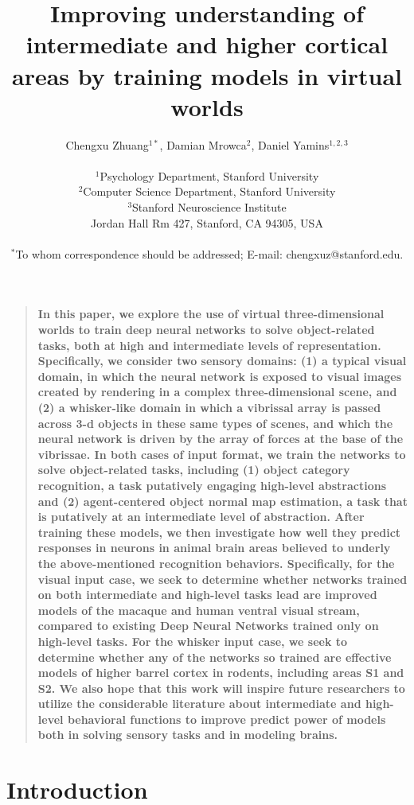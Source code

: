 \documentclass[12pt]{article}
\title{Improving understanding of intermediate and higher cortical areas by training models in virtual worlds}
\author
{Chengxu Zhuang$^{1\ast}$, Damian Mrowca$^{2}$, Daniel Yamins$^{1,2,3}$\\
\\
\normalsize{$^{1}$Psychology Department,  Stanford University}\\
\normalsize{$^{2}$Computer Science Department,  Stanford University}\\
\normalsize{$^{3}$Stanford Neuroscience Institute}\\
\normalsize{Jordan Hall Rm 427, Stanford, CA 94305, USA}\\
\\
\normalsize{$^\ast$To whom correspondence should be addressed; E-mail: chengxuz@stanford.edu.}
}
\date{}
\newenvironment{sciabstract}{%
\begin{quote} \bf}
{\end{quote}}
\begin{document}

\baselineskip24pt


\maketitle


\begin{sciabstract}
In this paper, we explore the use of virtual three-dimensional worlds to train deep neural networks to solve object-related tasks, both at high and intermediate levels of representation.
Specifically, we consider two sensory domains: (1) a typical visual domain, in which the neural network is exposed to visual images created by rendering in a complex three-dimensional scene, and (2) a whisker-like domain in which a vibrissal array is passed across 3-d objects in these same types of scenes, and which the neural network is driven by the array of forces at the base of the vibrissae.
In both cases of input format, we train the networks to solve object-related tasks, including (1) object category recognition, a task putatively engaging high-level abstractions and (2) agent-centered object normal map estimation, a task that is putatively at an intermediate level of abstraction.
After training these models, we then investigate how well they predict responses in neurons in animal brain areas believed to underly the above-mentioned recognition behaviors. Specifically, for the visual input case, we seek to determine whether networks trained on both intermediate and high-level tasks lead are improved models of the macaque and human ventral visual stream, compared to existing Deep Neural Networks trained only on high-level tasks. For the whisker input case, we seek to determine whether any of the networks so trained are effective models of higher barrel cortex in rodents, including areas S1 and S2. We also hope that this work will inspire future researchers to utilize the considerable literature about intermediate and high-level behavioral functions to improve predict power of models both in solving sensory tasks and in modeling brains.

\end{sciabstract}

\section*{Introduction}
\end{document}
